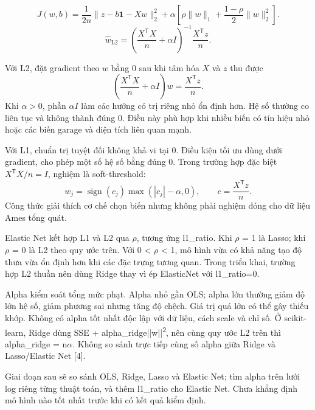 \documentclass[12pt,a4paper]{article}
\begin{document}
\begin{equation}
J(w,b)=\frac{1}{2n}\lVert z-b\bm 1-Xw\rVert_2^2
+\alpha\left[\rho\lVert w\rVert_1+\frac{1-\rho}{2}\lVert w\rVert_2^2\right].
\label{eq:elastic}
\end{equation}
\begin{equation}
\widehat{w}_{\mathrm{L2}}=
\left(\frac{X^{\mathsf T}X}{n}+\alpha I\right)^{-1}
\frac{X^{\mathsf T}z}{n}.
\label{eq:ridge}
\end{equation}


Với L2, đặt gradient theo $w$ bằng 0 sau khi tâm hóa $X$ và $z$ thu được
\[
\left(\frac{X^{\mathsf T}X}{n}+\alpha I\right)w=\frac{X^{\mathsf T}z}{n}.
\]
Khi $\alpha>0$, phần $\alpha I$ làm các hướng có trị riêng nhỏ ổn định hơn.
Hệ số thường co liên tục và không thành đúng 0. Điều này phù hợp khi nhiều
biến có tín hiệu nhỏ hoặc các biến garage và diện tích liên quan mạnh.

Với L1, chuẩn trị tuyệt đối không khả vi tại 0. Điều kiện tối ưu dùng
dưới gradient, cho phép một số hệ số bằng đúng 0. Trong trường hợp đặc biệt
$X^{\mathsf T}X/n=I$, nghiệm là soft-threshold:
\begin{equation}
w_j=\operatorname{sign}(c_j)\max(|c_j|-\alpha,0),\qquad
c=\frac{X^{\mathsf T}z}{n}.
\end{equation}
Công thức giải thích cơ chế chọn biến nhưng không phải nghiệm đóng cho
dữ liệu Ames tổng quát.

Elastic Net kết hợp L1 và L2 qua \ensuremath{\rho}, tương ứng l1\_ratio. Khi \ensuremath{\rho} = 1 là Lasso; khi \ensuremath{\rho} = 0 là L2 theo quy ước trên. Với 0 < \ensuremath{\rho} < 1, mô hình vừa có khả năng tạo độ thưa vừa ổn định hơn khi các đặc trưng tương quan. Trong triển khai, trường hợp L2 thuần nên dùng Ridge thay vì ép ElasticNet với l1\_ratio=0.


Alpha kiểm soát tổng mức phạt. Alpha nhỏ gần OLS; alpha lớn thường giảm độ lớn hệ số, giảm phương sai nhưng tăng độ chệch. Giá trị quá lớn có thể gây thiếu khớp. Không có alpha tốt nhất độc lập với dữ liệu, cách scale và chỉ số. Ở scikit-learn, Ridge dùng SSE + alpha\_ridge||w||\textsuperscript{2}, nên cùng quy ước L2 trên thì alpha\_ridge = n\ensuremath{\alpha}. Không so sánh trực tiếp cùng số alpha giữa Ridge và Lasso/Elastic Net [4].


Giai đoạn sau sẽ so sánh OLS, Ridge, Lasso và Elastic Net; tìm alpha trên lưới log riêng từng thuật toán, và thêm l1\_ratio cho Elastic Net. Chưa khẳng định mô hình nào tốt nhất trước khi có kết quả kiểm định.
\end{document}
